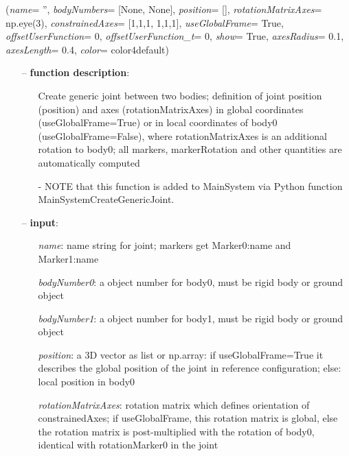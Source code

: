 %
\begin{flushleft}
\label{sec:mainsystemextensions:CreateGenericJoint}
({\it name}= '', {\it bodyNumbers}= [None, None], {\it position}= [], {\it rotationMatrixAxes}= np.eye(3), {\it constrainedAxes}= [1,1,1, 1,1,1], {\it useGlobalFrame}= True, {\it offsetUserFunction}= 0, {\it offsetUserFunction\_t}= 0, {\it show}= True, {\it axesRadius}= 0.1, {\it axesLength}= 0.4, {\it color}= color4default)
\end{flushleft}
\setlength{\itemindent}{0.7cm}
\begin{itemize}[leftmargin=0.7cm]
\item[--]
{\bf function description}: \vspace{-6pt}
\begin{itemize}[leftmargin=1.2cm]
\setlength{\itemindent}{-0.7cm}
\item[]Create generic joint between two bodies; definition of joint position (position) and axes (rotationMatrixAxes) in global coordinates (useGlobalFrame=True) or in local coordinates of body0 (useGlobalFrame=False), where rotationMatrixAxes is an additional rotation to body0; all markers, markerRotation and other quantities are automatically computed
\item[]- NOTE that this function is added to MainSystem via Python function MainSystemCreateGenericJoint.
\end{itemize}
\item[--]
{\bf input}: \vspace{-6pt}
\begin{itemize}[leftmargin=1.2cm]
\setlength{\itemindent}{-0.7cm}
\item[]{\it name}: name string for joint; markers get Marker0:name and Marker1:name
\item[]{\it bodyNumber0}: a object number for body0, must be rigid body or ground object
\item[]{\it bodyNumber1}: a object number for body1, must be rigid body or ground object
\item[]{\it position}: a 3D vector as list or np.array: if useGlobalFrame=True it describes the global position of the joint in reference configuration; else: local position in body0
\item[]{\it rotationMatrixAxes}: rotation matrix which defines orientation of constrainedAxes; if useGlobalFrame, this rotation matrix is global, else the rotation matrix is post-multiplied with the rotation of body0, identical with rotationMarker0 in the joint

\end{itemize}
\end{itemize}

